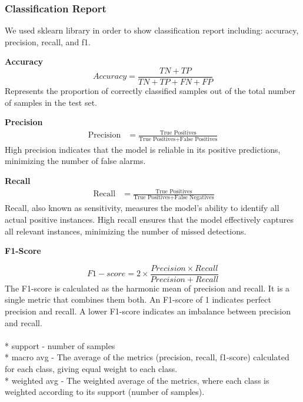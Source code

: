 \documentclass{article}
\begin{document}
\subsubsection{Classification Report}
We used sklearn library in order to show classification report including: accuracy, precision, recall, and f1.

\textbf{Accuracy}
\begin{equation*}
Accuracy = \frac{TN + TP}{TN + TP + FN + FP}
\end{equation*}
Represents the proportion of correctly classified samples out of the total number of samples in the test set.

\textbf{Precision}
\begin{align*}
    \text{Precision} &= \frac{\text{True Positives}}{\text{True Positives} + \text{False Positives}}
\end{align*}
High precision indicates that the model is reliable in its positive predictions, minimizing the number of false alarms.   

\textbf{Recall}
\begin{align*}\
    \text{Recall} &= \frac{\text{True Positives}}{\text{True Positives} + \text{False Negatives}}
\end{align*}
Recall, also known as sensitivity, measures the model's ability to identify all actual positive instances. High recall ensures that the model effectively captures all relevant instances, minimizing the number of missed detections.

\textbf{F1-Score}

\begin{equation*}
    F1-score = 2 \times \frac{Precision \times Recall}{Precision + Recall}
\end{equation*}
The F1-score is calculated as the harmonic mean of precision and recall. It is a single metric that combines them both.
An F1-score of 1 indicates perfect precision and recall.
A lower F1-score indicates an imbalance between precision and recall. \\ \\
* support - number of samples \\
* macro avg - The average of the metrics (precision, recall, f1-score) calculated for each class, giving equal weight to each class. \\
* weighted avg -  The weighted average of the metrics, where each class is weighted according to its support (number of samples).
\end{document}
